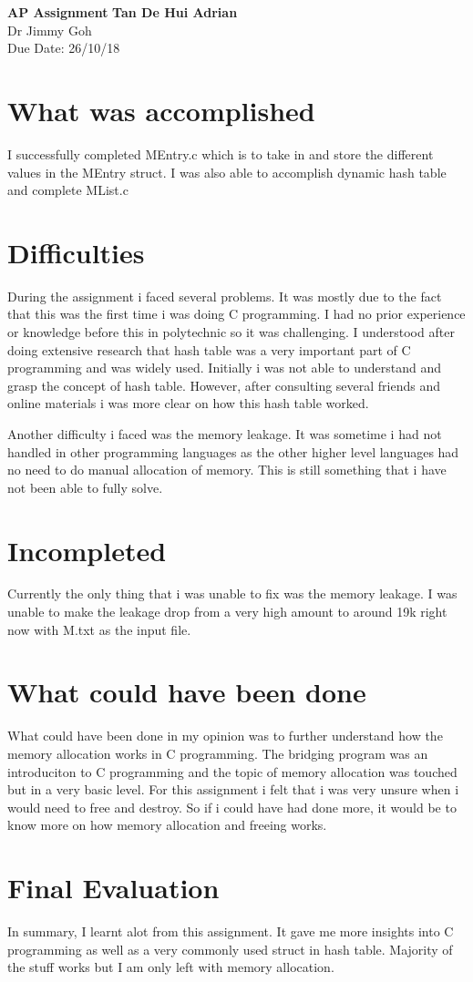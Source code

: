\documentclass[a4paper, 11pt]{article}
\begin{document}
\noindent
\large\textbf{AP Assignment} \hfill \textbf{Tan De Hui Adrian} \\
Dr Jimmy Goh \\
Due Date: 26/10/18

\section*{What was accomplished}
I successfully completed MEntry.c which is to take in and store the different values in the MEntry struct.
I was also able to accomplish dynamic hash table and complete MList.c

\section*{Difficulties}
During the assignment i faced several problems. It was mostly due to the fact that this was the first time i was doing C programming. I had no prior experience or knowledge before this in polytechnic so it was challenging.
I understood after doing extensive research that hash table was a very important part of C programming and was widely used. Initially i was not able to understand and grasp the concept of hash table. However, after consulting several friends and online materials i was more clear on how this hash table worked.

Another difficulty i faced was the memory leakage. It was sometime i had not handled in other programming languages as the other higher level languages had no need to do manual allocation of memory. This is still something that i have not been able to fully solve.

\section*{Incompleted}
Currently the only thing that i was unable to fix was the memory leakage. I was unable to make the leakage drop from a very high amount to around 19k right now with M.txt as the input file. 

\section*{What could have been done}
What could have been done in my opinion was to further understand how the memory allocation works in C programming. The bridging program was an introduciton to C programming and the topic of memory allocation was touched but in a very basic level. For this assignment i felt that i was very unsure when i would need to free and destroy. So if i could have had done more, it would be to know more on how memory allocation and freeing works.

\section*{Final Evaluation}
In summary, I learnt alot from this assignment. It gave me more insights into C programming as well as a very commonly used struct in hash table.
Majority of the stuff works but I am only left with memory allocation.
\end{document}
